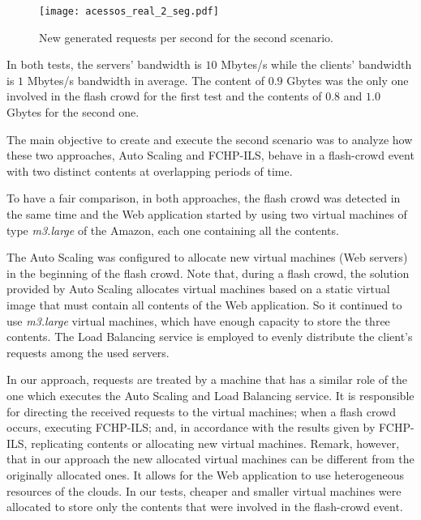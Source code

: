 	
\begin{figure}[ht]
\centering
\begin{center}
\texttt{[image: acessos\_real\_2\_seg.pdf]} \\
\end{center}
\caption{New generated requests per second for the second scenario.}
\label{fc-figure2}
\end{figure}
		
	In both tests, the servers' bandwidth is  $10$ Mbytes/s while  the clients' bandwidth  is $1$ Mbytes/s  bandwidth  in average. The content of $0.9$ Gbytes was the only one involved in the flash crowd for the first test and the contents of $0.8$ and $1.0$ Gbytes for the second one.
	
	The main objective to create and execute the second scenario was to analyze how these two approaches, Auto Scaling and  FCHP-ILS,  behave in a flash-crowd event with two distinct contents at overlapping periods of time. 

	To have a fair comparison, in both approaches, the flash crowd was detected in the same time and the Web application started by using two virtual machines of type \textit{m3.large}  of the Amazon, each one containing all the contents.	
	
	The Auto Scaling was configured to allocate new virtual machines (Web servers) in the beginning of the flash crowd. 
	Note that, during a flash crowd, the solution provided by Auto Scaling allocates virtual machines based on a static virtual image that must contain all contents of the Web application.
	 So it continued to use  \textit{m3.large} virtual machines,  which have  enough capacity to store the three contents. The  Load Balancing service is employed to evenly distribute the client's requests among the used  servers. 
	
	In our approach, requests are treated by a machine that has a similar role  of the one which executes the Auto Scaling and  Load Balancing service. It is responsible for directing the received requests to the virtual machines; when a flash crowd  occurs,  executing   FCHP-ILS;   and,  in accordance with the results given by FCHP-ILS, replicating contents or allocating  new virtual machines. Remark, however, that in our approach the new  allocated virtual machines can be different from the originally allocated ones. It allows for the Web application to use heterogeneous resources of the clouds. In our tests, cheaper and smaller virtual machines were allocated to store only the contents that were involved in the flash-crowd event. 
	
